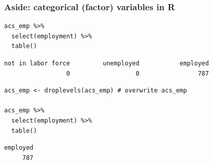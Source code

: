 \documentclass[11pt,containsverbatim,handout,xcolor=xelatex,dvipsnames,table]{beamer}
\begin{document}
\begin{frame}[fragile]
\frametitle{Aside: categorical (factor) variables in R}

{\footnotesize
\begin{Verbatim}[frame=single, formatcom=\color{blue}]
acs_emp %>%
  select(employment) %>%
  table()
\end{Verbatim}

\pause

\begin{Verbatim}[frame=single, formatcom=\color{gray}]
not in labor force         unemployed           employed 
                 0                  0                787
\end{Verbatim}

\pause

\begin{Verbatim}[frame=single, formatcom=\color{blue}]
acs_emp <- droplevels(acs_emp) # overwrite acs_emp

acs_emp %>%
  select(employment) %>%
  table()
\end{Verbatim}

\begin{Verbatim}[frame=single, formatcom=\color{gray}]
employed 
     787 
\end{Verbatim}
}

\end{frame}

\end{document}
